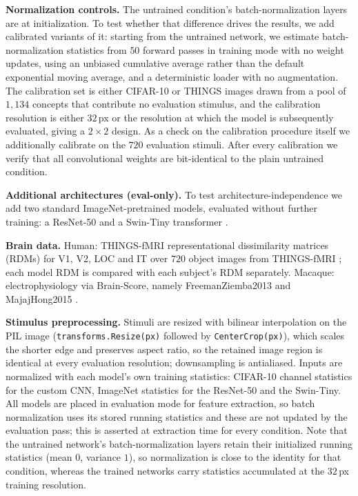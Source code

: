 \documentclass[10pt,twocolumn]{article}
\begin{document}
\textbf{Normalization controls.} The untrained condition's batch-normalization layers are at initialization. To test whether that difference drives the results, we add calibrated variants of it: starting from the untrained network, we estimate batch-normalization statistics from $50$ forward passes in training mode with no weight updates, using an unbiased cumulative average rather than the default exponential moving average, and a deterministic loader with no augmentation. The calibration set is either CIFAR-10 or THINGS images drawn from a pool of $1{,}134$ concepts that contribute no evaluation stimulus, and the calibration resolution is either $32$\,px or the resolution at which the model is subsequently evaluated, giving a $2\times2$ design. As a check on the calibration procedure itself we additionally calibrate on the $720$ evaluation stimuli. After every calibration we verify that all convolutional weights are bit-identical to the plain untrained condition.

\textbf{Additional architectures (eval-only).} To test architecture-independence we add two standard ImageNet-pretrained models, evaluated without further training: a ResNet-50 \citep[torchvision \texttt{IMAGENET1K\_V2};][]{he2016} and a Swin-Tiny transformer \citep[torchvision \texttt{IMAGENET1K\_V1};][]{liu2021}.

\textbf{Brain data.} Human: THINGS-fMRI representational dissimilarity matrices (RDMs) for V1, V2, LOC and IT over $720$ object images from THINGS-fMRI \citep[3T Siemens Magnetom Prisma, $3$ subjects;][]{hebart2023}; each model RDM is compared with each subject's RDM separately. Macaque: electrophysiology via Brain-Score, namely FreemanZiemba2013 \citep[V1, V2; $135$ texture stimuli;][]{freeman2013} and MajajHong2015 \citep[V4, IT; $3{,}200$ object presentations;][]{majaj2015}.

\textbf{Stimulus preprocessing.} Stimuli are resized with bilinear interpolation on the PIL image (\texttt{transforms.Resize(px)} followed by \texttt{CenterCrop(px)}), which scales the shorter edge and preserves aspect ratio, so the retained image region is identical at every evaluation resolution; downsampling is antialiased. Inputs are normalized with each model's own training statistics: CIFAR-10 channel statistics for the custom CNN, ImageNet statistics for the ResNet-50 and the Swin-Tiny. All models are placed in evaluation mode for feature extraction, so batch normalization uses its stored running statistics and these are not updated by the evaluation pass; this is asserted at extraction time for every condition. Note that the untrained network's batch-normalization layers retain their initialized running statistics (mean $0$, variance $1$), so normalization is close to the identity for that condition, whereas the trained networks carry statistics accumulated at the $32$\,px training resolution.
\end{document}
